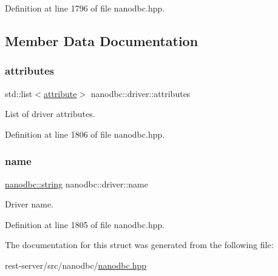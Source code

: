 Definition at line 1796 of file nanodbc.\+hpp.



\subsection{Member Data Documentation}
\mbox{\label{structnanodbc_1_1driver_a4528ae3553031578ba886933c03c3f35}} 
\subsubsection{\texorpdfstring{attributes}{attributes}}
{\footnotesize\ttfamily std\+::list$<$\mbox{\hyperlink{structnanodbc_1_1driver_1_1attribute}{attribute}}$>$ nanodbc\+::driver\+::attributes}



List of driver attributes. 



Definition at line 1806 of file nanodbc.\+hpp.

\mbox{\label{structnanodbc_1_1driver_a199181975093cc309564d0de3b296c71}} 
\subsubsection{\texorpdfstring{name}{name}}
{\footnotesize\ttfamily \mbox{\hyperlink{namespacenanodbc_abfc0ece56278e590911ec8352774c212}{nanodbc\+::string}} nanodbc\+::driver\+::name}



Driver name. 



Definition at line 1805 of file nanodbc.\+hpp.



The documentation for this struct was generated from the following file\+:\begin{DoxyCompactItemize}
\item 
rest-\/server/src/nanodbc/\mbox{\hyperlink{nanodbc_8hpp}{nanodbc.\+hpp}}\end{DoxyCompactItemize}
